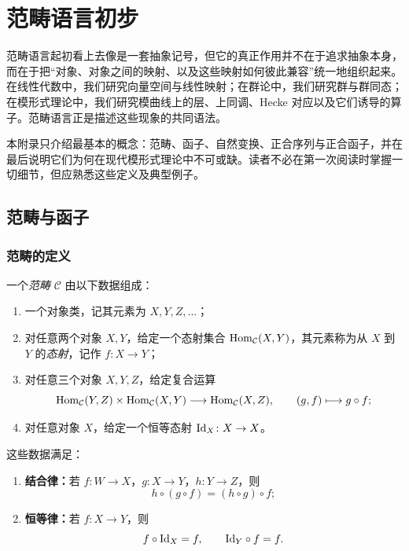 \chapter{范畴语言初步}

范畴语言起初看上去像是一套抽象记号，但它的真正作用并不在于追求抽象本身，而在于把“对象、对象之间的映射、以及这些映射如何彼此兼容”统一地组织起来。在线性代数中，我们研究向量空间与线性映射；在群论中，我们研究群与群同态；在模形式理论中，我们研究模曲线上的层、上同调、Hecke 对应以及它们诱导的算子。范畴语言正是描述这些现象的共同语法。

本附录只介绍最基本的概念：范畴、函子、自然变换、正合序列与正合函子，并在最后说明它们为何在现代模形式理论中不可或缺。读者不必在第一次阅读时掌握一切细节，但应熟悉这些定义及典型例子。

\section{范畴与函子}

\subsection{范畴的定义}

\begin{definition}
一个\emph{范畴} $\mathcal C$ 由以下数据组成：
\begin{enumerate}[label=(\arabic*), leftmargin=2.5em]
  \item 一个对象类，记其元素为 $X,Y,Z,\dots$；
  \item 对任意两个对象 $X,Y$，给定一个态射集合 $\mathrm{Hom}_{\mathcal C}(X,Y)$，其元素称为从 $X$ 到 $Y$ 的\emph{态射}，记作 $f\colon X\to Y$；
  \item 对任意三个对象 $X,Y,Z$，给定复合运算
  \[
    \mathrm{Hom}_{\mathcal C}(Y,Z)\times \mathrm{Hom}_{\mathcal C}(X,Y)\longrightarrow \mathrm{Hom}_{\mathcal C}(X,Z),
    \qquad (g,f)\longmapsto g\circ f;
  \]
  \item 对任意对象 $X$，给定一个恒等态射 $\mathrm{Id}_X\colon X\to X$。
\end{enumerate}
这些数据满足：
\begin{enumerate}[label=(\roman*), leftmargin=2.5em]
  \item \textbf{结合律：}若 $f\colon W\to X$，$g\colon X\to Y$，$h\colon Y\to Z$，则
  \[
    h\circ (g\circ f)=(h\circ g)\circ f;
  \]
  \item \textbf{恒等律：}若 $f\colon X\to Y$，则
  \[
    f\circ \mathrm{Id}_X=f,
    \qquad
    \mathrm{Id}_Y\circ f=f.
  \]
\end{enumerate}
\end{definition}

